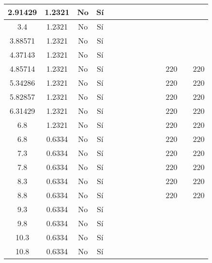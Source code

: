 \begin{table}[H]
{\begin{tabular}{|c|c|c|c|c|c|c|c|c|c|c|c|c|c|}
\hline
2.91429 & 1.2321 & No  & Sí  &     &     &     &     &     &     &     &     &     &  \bigstrut\\
\hline
3.4 & 1.2321 & No  & Sí  &     &     &     &     &     &     &     &     &     &  \bigstrut\\
\hline
3.88571 & 1.2321 & No  & Sí  &     &     &     &     &     &     &     &     &     &  \bigstrut\\
\hline
4.37143 & 1.2321 & No  & Sí  &     &     &     &     &     &     &     &     &     &  \bigstrut\\
\hline
4.85714 & 1.2321 & No  & Sí  &     &     &     &     &     &     &     & 220 &     & 220 \bigstrut\\
\hline
5.34286 & 1.2321 & No  & Sí  &     &     &     &     &     &     &     & 220 &     & 220 \bigstrut\\
\hline
5.82857 & 1.2321 & No  & Sí  &     &     &     &     &     &     &     & 220 &     & 220 \bigstrut\\
\hline
6.31429 & 1.2321 & No  & Sí  &     &     &     &     &     &     &     & 220 &     & 220 \bigstrut\\
\hline
6.8 & 1.2321 & No  & Sí  &     &     &     &     &     &     &     & 220 &     & 220 \bigstrut\\
\hline
6.8 & 0.6334 & No  & Sí  &     &     &     &     &     &     &     & 220 &     & 220 \bigstrut\\
\hline
7.3 & 0.6334 & No  & Sí  &     &     &     &     &     &     &     & 220 &     & 220 \bigstrut\\
\hline
7.8 & 0.6334 & No  & Sí  &     &     &     &     &     &     &     & 220 &     & 220 \bigstrut\\
\hline
8.3 & 0.6334 & No  & Sí  &     &     &     &     &     &     &     & 220 &     & 220 \bigstrut\\
\hline
8.8 & 0.6334 & No  & Sí  &     &     &     &     &     &     &     & 220 &     & 220 \bigstrut\\
\hline
9.3 & 0.6334 & No  & Sí  &     &     &     &     &     &     &     &     &     &  \bigstrut\\
\hline
9.8 & 0.6334 & No  & Sí  &     &     &     &     &     &     &     &     &     &  \bigstrut\\
\hline
10.3 & 0.6334 & No  & Sí  &     &     &     &     &     &     &     &     &     &  \bigstrut\\
\hline
10.8 & 0.6334 & No  & Sí  &     &     &     &     &     &     &     &     &     &  \bigstrut\\
\hline

\end{tabular}}
\end{table}
